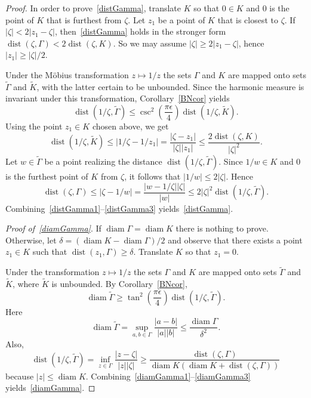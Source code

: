 \documentclass[11pt]{amsart}
\theoremstyle{remark}
\numberwithin{equation}{section}
\newcommand{\abs}[1]{\lvert#1\rvert}
\DeclareMathOperator{\dist}{dist}
\DeclareMathOperator{\diam}{diam}
\begin{document}
\begin{proof} In order to prove~\eqref{distGamma}, translate $K$ so that $0\in K$ and $0$ is the point of $K$ that is furthest from $\zeta$. Let $z_1$ be a point of $K$ that is closest to $\zeta$. 
If $\abs{\zeta}< 2\abs{z_1-\zeta}$, then~\eqref{distGamma} holds in the stronger form  
$\dist(\zeta,\Gamma) < 2\dist(\zeta,K)$. So we may assume $\abs{\zeta} \ge 2\abs{z_1-\zeta}$, hence $\abs{z_1} \ge  \abs{\zeta}/2$. 

Under the M\"obius transformation $z\mapsto 1/z$ the sets $\Gamma$ and $K$ are mapped onto sets $\tilde \Gamma$ and $\tilde K$, with the latter certain to be unbounded. Since the harmonic measure is invariant under this transformation, Corollary~\ref{BNcor} yields 
\begin{equation}\label{distGamma1}
\dist(1/\zeta, \tilde\Gamma)\le \csc^2 \left(\frac{\pi \epsilon}{4}\right) \dist(1/\zeta, \tilde K).
\end{equation}
Using the point $z_1 \in K$ chosen above, we get 
\begin{equation}\label{distGamma2}
\dist(1/\zeta, \tilde K) \le \abs{1/\zeta - 1/z_1} = \frac{\abs{\zeta-z_1}}{\abs{\zeta}\abs{z_1}} 
\le  \frac{2\dist(\zeta, K)}{\abs{\zeta}^2}.
\end{equation}
Let $w\in \tilde\Gamma$ be a point realizing the distance $\dist(1/\zeta, \tilde\Gamma)$. Since $1/w \in   K$ and $0$ is the furthest point of $K$ from $\zeta$, it follows that $\abs{1/w} \le 2\abs{\zeta}$. Hence 
\begin{equation}\label{distGamma3}
\dist(\zeta,\Gamma)\le 
\abs{\zeta - 1/w } = \frac{\abs{w-1/\zeta} \abs{\zeta}}{\abs{w}} \le 2 \abs{\zeta}^2 \dist(1/\zeta, \tilde\Gamma). 
\end{equation}
Combining~\eqref{distGamma1}--\eqref{distGamma3} yields~\eqref{distGamma}.

\textit{Proof of~\eqref{diamGamma}}. If $\diam \Gamma=\diam K$ there is nothing to prove. Otherwise, let $\delta =  (\diam K - \diam \Gamma)/2$ and observe that there exists a point $z_1\in K$ such that $\dist(z_1, \Gamma)\ge \delta$. Translate $K$ so that $z_1 = 0$. 

Under the transformation $z\mapsto 1/z$ the sets $\Gamma$ and $K$ are mapped onto sets $\tilde \Gamma$ and $\tilde K$, where $\tilde K$ is unbounded. By Corollary~\ref{BNcor}, 
\begin{equation}\label{diamGamma1}
\diam \tilde \Gamma \ge \tan^2 \left(\frac{\pi \epsilon}{4} \right) \dist(1/\zeta, \tilde \Gamma).
\end{equation}
Here
\begin{equation}\label{diamGamma2}
\diam \tilde \Gamma  = \sup_{a,b\in\Gamma}\frac{\abs{a-b}}{\abs{a}\abs{b}} \le \frac{\diam\Gamma}{\delta^2}.
\end{equation}
Also,
\begin{equation}\label{diamGamma3}
\dist(1/\zeta, \tilde \Gamma) = \inf_{z\in \Gamma}\frac{\abs{z-\zeta}}{\abs{z}\abs{\zeta}} 
\ge \frac{\dist(\zeta, \Gamma)}{\diam K(\diam K +\dist(\zeta,\Gamma))}
\end{equation}
because $\abs{z}\le \diam K$.  Combining~\eqref{diamGamma1}--\eqref{diamGamma3} yields~\eqref{diamGamma}.
\end{proof}
\end{document}
